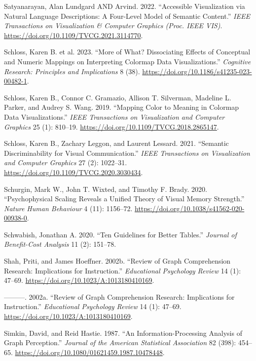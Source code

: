 \documentclass[
  letterpaper,
  DIV=11,
  numbers=noendperiod]{scrreprt}
\newlength{\cslhangindent}
\newenvironment{CSLReferences}[2] %
 {\begin{list}{}{%
  \setlength{\itemindent}{0pt}
  \setlength{\leftmargin}{0pt}
  \setlength{\parsep}{0pt}
  \ifodd #1
   \setlength{\leftmargin}{\cslhangindent}
   \setlength{\itemindent}{-1\cslhangindent}
  \fi
  \setlength{\itemsep}{#2\baselineskip}}}
 {\end{list}}
\begin{document}
\begin{CSLReferences}{1}{0}
Satyanarayan, Alan Lundgard AND Arvind. 2022. {``{Accessible
Visualization via Natural Language Descriptions: A Four-Level Model of
Semantic Content}.''} \emph{IEEE Transactions on Visualization \&
Computer Graphics (Proc. IEEE VIS)}.
\url{https://doi.org/10.1109/TVCG.2021.3114770}.

Schloss, Karen B. et al. 2023. {``More of What? Dissociating Effects of
Conceptual and Numeric Mappings on Interpreting Colormap Data
Visualizations.''} \emph{Cognitive Research: Principles and
Implications} 8 (38). \url{https://doi.org/10.1186/s41235-023-00482-1}.

Schloss, Karen B., Connor C. Gramazio, Allison T. Silverman, Madeline L.
Parker, and Audrey S. Wang. 2019. {``Mapping Color to Meaning in
Colormap Data Visualizations.''} \emph{IEEE Transactions on
Visualization and Computer Graphics} 25 (1): 810--19.
\url{https://doi.org/10.1109/TVCG.2018.2865147}.

Schloss, Karen B., Zachary Leggon, and Laurent Lessard. 2021.
{``Semantic Discriminability for Visual Communication.''} \emph{IEEE
Transactions on Visualization and Computer Graphics} 27 (2): 1022--31.
\url{https://doi.org/10.1109/TVCG.2020.3030434}.

Schurgin, Mark W., John T. Wixted, and Timothy F. Brady. 2020.
{``Psychophysical Scaling Reveals a Unified Theory of Visual Memory
Strength.''} \emph{Nature Human Behaviour} 4 (11): 1156--72.
\url{https://doi.org/10.1038/s41562-020-00938-0}.

Schwabish, Jonathan A. 2020. {``Ten Guidelines for Better Tables.''}
\emph{Journal of Benefit-Cost Analysis} 11 (2): 151--78.

Shah, Priti, and James Hoeffner. 2002b. {``Review of Graph Comprehension
Research: Implications for Instruction.''} \emph{Educational Psychology
Review} 14 (1): 47--69. \url{https://doi.org/10.1023/A:1013180410169}.

---------. 2002a. {``Review of Graph Comprehension Research:
Implications for Instruction.''} \emph{Educational Psychology Review} 14
(1): 47--69. \url{https://doi.org/10.1023/A:1013180410169}.

Simkin, David, and Reid Hastie. 1987. {``An Information-Processing
Analysis of Graph Perception.''} \emph{Journal of the American
Statistical Association} 82 (398): 454--65.
\url{https://doi.org/10.1080/01621459.1987.10478448}.


\end{CSLReferences}
\end{document}
